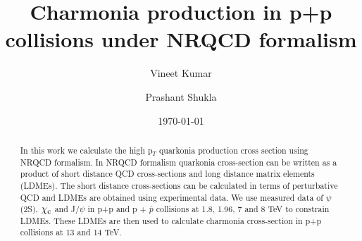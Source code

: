 \documentclass[aps,prc,preprint,superscriptaddress,showpacs,showkeys,amsmath]{revtex4-1}
\begin{document}
\newcommand{\Jpsi}{J/\psi}
\newcommand{\pT}{p_{T}}
\newcommand{\calO}{{\cal{O}}}
\newcommand{\barQ}{{\bar{Q}}}
\newcommand{\barq}{{\bar{q}}}
\newcommand{\barc}{{\bar{c}}}
\newcommand{\barb}{{\bar{b}}}
\newcommand{\baru}{\bar{u}}
\newcommand{\barv}{\bar{v}}
\newcommand{\barup}{\bar{u}_{+}}
\newcommand{\barum}{\bar{u}_{-}}
\newcommand{\barvp}{\bar{v}_{+}}
\newcommand{\barvm}{\bar{v}_{-}}
\newcommand{\charm}{{\rm{charm}}}
\newcommand{\bottom}{{\rm{bottom}}}

\newcommand{\cs}{{\hat{s}}}
\newcommand{\ct}{{\hat{t}}}
\newcommand{\cu}{{\hat{u}}}
\newcommand{\alphas}{{\alpha_{s}}}


\newcommand{\shat}{\hat{\rm s}}
\newcommand{\that}{\hat{\rm t}}
\newcommand{\uhat}{\hat{\rm u}}
\newcommand{\zhat}{\hat{\rm z}}

\newcommand{\CA}{{\cal A}}
\newcommand{\Qbar}{{\overline Q}}
\newcommand{\QQbaroctetgen}{{Q\Qbar[ ^{2S+1}L_J^{(8)}]}}
\newcommand{\QQbaroctetsingS}{{Q\Qbar[ ^1S_0^{(8)}]}}
\newcommand{\QQbaroctettripP}{{Q\Qbar[ ^3P_J^{(8)}]}}
\newcommand{\QQbaroctettripPone}{{Q\Qbar[ ^3P_1^{(8)}]}}

\def\QQbaroctettripS{Q\Qbar[ ^3S_1^{(8)}]}
\def\QQbaroctetPzero{Q\Qbar[ ^3P_0^{(8)}]}
\def\QQbaroctetPone{Q\Qbar[ ^3P_1^{(8)}]}
\def\QQbaroctetPtwo{Q\Qbar[ ^3P_2^{(8)}]}



\title{{\Large Charmonia production in p+p collisions under NRQCD formalism}} 
\author{\large Vineet Kumar}
\author{\large Prashant Shukla}

\date{\today}

\begin{abstract}
  In this work we calculate the high p$_{T}$ quarkonia production cross 
section using NRQCD formalism. In NRQCD formalism quarkonia cross-section 
can be written as a product of short distance QCD cross-sections and long 
distance matrix elements (LDMEs). The short distance cross-sections can be 
calculated in terms of perturbative QCD and LDMEs are obtained using 
experimental data.  We use measured data of $\psi$(2S), $\chi_{\rm c}$ and 
J/$\psi$ in p+p and p + {$\bar p$} collisions at 1.8, 1.96, 7 and 8 TeV to 
constrain LDMEs. These LDMEs are then used to calculate charmonia cross-section 
in p+p collisions at 13 and 14 TeV.
\end{abstract}
\end{document}
